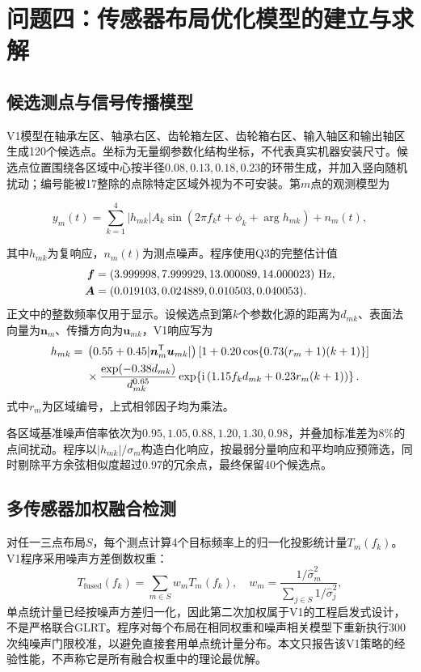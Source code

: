 \documentclass[withoutpreface,bwprint]{cumcmthesis}
\begin{document}
\section{问题四：传感器布局优化模型的建立与求解}

\subsection{候选测点与信号传播模型}
V1模型在轴承左区、轴承右区、齿轮箱左区、齿轮箱右区、输入轴区和输出轴区生成120个候选点。坐标为无量纲参数化结构坐标，不代表真实机器安装尺寸。候选点位置围绕各区域中心按半径$0.08,0.13,0.18,0.23$的环带生成，并加入竖向随机扰动；编号能被17整除的点除特定区域外视为不可安装。第$m$点的观测模型为

\begin{equation}
y_m(t) = \sum_{k=1}^{4} |h_{mk}| A_k \sin(2\pi f_k t + \phi_k + \arg h_{mk}) + n_m(t),
\end{equation}

其中$h_{mk}$为复响应，$n_m(t)$为测点噪声。程序使用Q3的完整估计值
\begin{align*}
\boldsymbol f&=(3.999998,7.999929,13.000089,14.000023)\ {\rm Hz},\\
\boldsymbol A&=(0.019103,0.024889,0.010503,0.040053).
\end{align*}
正文中的整数频率仅用于显示。设候选点到第$k$个参数化源的距离为$d_{mk}$、表面法向量为$\boldsymbol n_m$、传播方向为$\boldsymbol u_{mk}$，V1响应写为
\begin{align}
h_{mk}={}&\left(0.55+0.45|\boldsymbol n_m^\mathsf T\boldsymbol u_{mk}|\right)
\left[1+0.20\cos\{0.73(r_m+1)(k+1)\}\right]\notag\\
&\times\frac{\exp(-0.38d_{mk})}{d_{mk}^{0.65}}
\exp\!\left\{\mathrm i\left(1.15f_kd_{mk}+0.23r_m(k+1)\right)\right\}.
\end{align}
式中$r_m$为区域编号，上式相邻因子均为乘法。

各区域基准噪声倍率依次为$0.95,1.05,0.88,1.20,1.30,0.98$，并叠加标准差为8\%的点间扰动。程序以$|h_{mk}|/\sigma_m$构造白化响应，按最弱分量响应和平均响应预筛选，同时剔除平方余弦相似度超过0.97的冗余点，最终保留40个候选点。

\subsection{多传感器加权融合检测}
对任一三点布局$S$，每个测点计算4个目标频率上的归一化投影统计量$T_m(f_k)$。V1程序采用噪声方差倒数权重：
\begin{equation}
T_{\text{fused}}(f_k) = \sum_{m\in S} w_m T_m(f_k), \quad w_m = \frac{1/\hat{\sigma}_m^2}{\sum_{j\in S} 1/\hat{\sigma}_j^2},
\end{equation}
单点统计量已经按噪声方差归一化，因此第二次加权属于V1的工程启发式设计，不是严格联合GLRT。程序对每个布局在相同权重和噪声相关模型下重新执行300次纯噪声门限校准，以避免直接套用单点统计量分布。本文只报告该V1策略的经验性能，不声称它是所有融合权重中的理论最优解。
\end{document}
